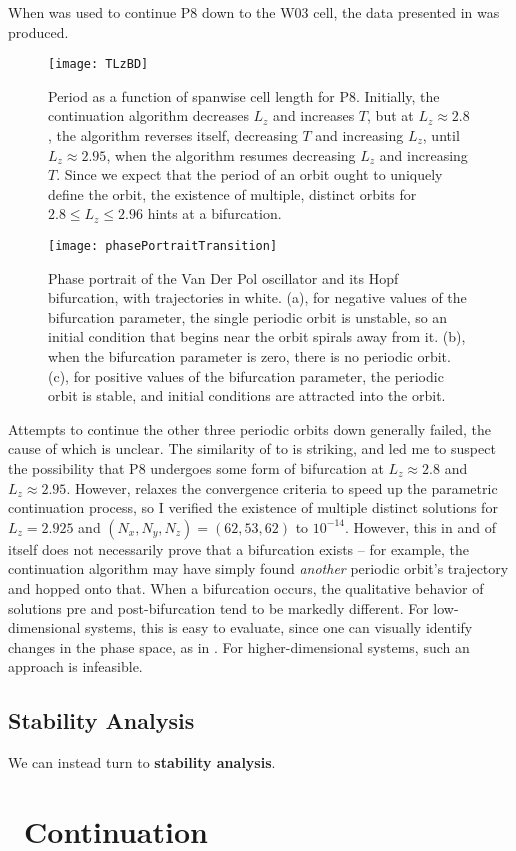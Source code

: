 When  was used to continue P8 down to the W03 cell, the data presented in  was produced.
\begin{figure}[b!]
\texttt{[image: TLzBD]}
\caption{Period as a function of spanwise cell length for P8. Initially, the continuation algorithm decreases $L_z$ and increases $T$, but at $L_z \approx 2.8$, the algorithm reverses itself, decreasing $T$ and increasing $L_z$, until $L_z \approx 2.95$, when the algorithm resumes decreasing $L_z$ and increasing $T$. Since we expect that the period of an orbit ought to uniquely define the orbit, the existence of multiple, distinct orbits for $2.8 \leq L_z \leq 2.96$ hints at a bifurcation.}\label{fig:LZBif}
\end{figure}
\begin{figure}[t]
\texttt{[image: phasePortraitTransition]}
\caption{Phase portrait of the Van Der Pol oscillator and its Hopf bifurcation, with trajectories in white. (a), for negative values of the bifurcation parameter, the single periodic orbit is unstable, so an initial condition that begins near the orbit spirals away from it. (b), when the bifurcation parameter is zero, there is no periodic orbit. (c), for positive values of the bifurcation parameter, the periodic orbit is stable, and initial conditions are attracted into the orbit.}\label{fig:phasePortrait}
\end{figure}
 Attempts to continue the other three periodic orbits down generally failed, the cause of which is unclear. The similarity of  to  is striking, and led me to suspect the possibility that P8 undergoes some form of bifurcation at $L_z \approx 2.8$ and $L_z \approx 2.95$. However,  relaxes the convergence criteria to speed up the parametric continuation process, so I verified the existence of multiple distinct solutions for $L_z = 2.925$ and $(N_x,N_y,N_z) = (62,53,62)$ to $10^{-14}$. However, this in and of itself does not necessarily prove that a bifurcation exists -- for example, the continuation algorithm may have simply found \emph{another} periodic orbit's trajectory and hopped onto that. When a bifurcation occurs, the qualitative behavior of solutions pre and post-bifurcation tend to be markedly different. For low-dimensional systems, this is easy to evaluate, since one can visually identify changes in the phase space, as in . For higher-dimensional systems, such an approach is infeasible. 

\subsection{Stability Analysis}

We can instead turn to {\bf stability analysis}. 



\section{\ReN\ Continuation}




  